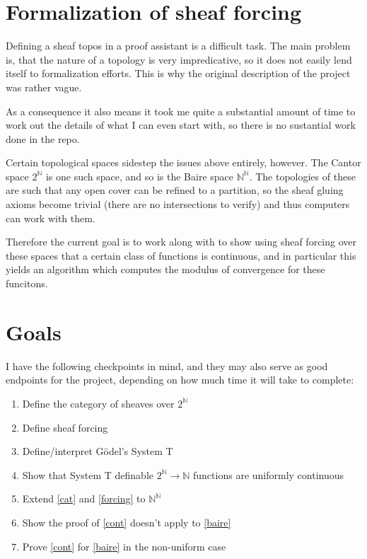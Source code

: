 \documentclass{article}
\begin{document}
\section{Formalization of sheaf forcing}
Defining a sheaf topos in a proof assistant is a difficult task.
The main problem is, that the nature of a topology is very impredicative,
so it does not easily lend itself to formalization efforts.
This is why the original description of the project was rather vague.

As a consequence it also means it took me quite a substantial amount of time
to work out the details of what I can even start with, so there is no sustantial work
done in the repo.

Certain topological spaces sidestep the issues above entirely, however.
The Cantor space $2^ℕ$ is one such space, and so is the Baire space $ℕ^ℕ$.
The topologies of these are such that any open cover can be refined to a partition,
so the sheaf gluing axioms become trivial (there are no intersections to verify)
and thus computers can work with them.

Therefore the current goal is to work along with \cite{coquand,dialogue}
to show using sheaf forcing over these spaces
that a certain class of functions is continuous, and in particular this
yields an algorithm which computes the modulus of convergence for these funcitons.

\section{Goals}

I have the following checkpoints in mind, and they may also serve as good endpoints for the project,
depending on how much time it will take to complete:
\begin{enumerate}[(1)]
	\item\label{cat} Define the category of sheaves over $2^ℕ$
	\item\label{forcing} Define sheaf forcing
	\item\label{syst} Define/interpret Gödel's System T
	\item\label{cont} Show that System T definable $2^ℕ → ℕ$ functions are uniformly continuous
	\item\label{baire} Extend \ref{cat} and \ref{forcing} to $ℕ^ℕ$
	\item Show the proof of \ref{cont} doesn't apply to \ref{baire}
	\item Prove \ref{cont} for \ref{baire} in the non-uniform case
\end{enumerate}
\end{document}
